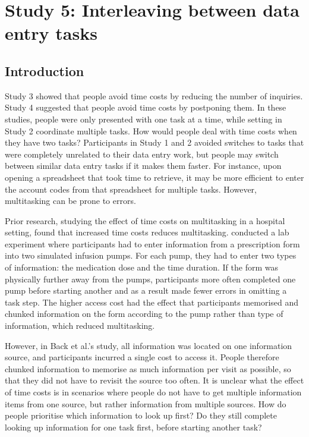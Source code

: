\section{Study 5: Interleaving between data entry tasks}
 
\subsection{Introduction}
Study 3 showed that people avoid time costs by reducing the number of inquiries. Study 4 suggested that people avoid time costs by postponing them. In these studies, people were only presented with one task at a time, while setting in Study 2 coordinate multiple tasks. How would people deal with time costs when they have two tasks? Participants in Study 1 and 2 avoided switches to tasks that were completely unrelated to their data entry work, but people may switch between similar data entry tasks if it makes them faster. For instance, upon opening a spreadsheet that took time to retrieve, it may be more efficient to enter the account codes from that spreadsheet for multiple tasks. However, multitasking can be prone to errors. 

Prior research, studying the effect of time costs on multitasking in a hospital setting, found that increased time costs reduces multitasking. \citet{Back2012} conducted a lab experiment where participants had to enter information from a prescription form into two simulated infusion pumps. For each pump, they had to enter two types of information: the medication dose and the time duration. If the form was physically further away from the pumps, participants more often completed one pump before starting another and as a result made fewer errors in omitting a task step. The higher access cost had the effect that participants memorised and chunked information on the form according to the pump rather than type of information, which reduced multitasking.

However, in Back et al.'s study, all information was located on one information source, and participants incurred a single cost to access it. People therefore chunked information to memorise as much information per visit as possible, so that they did not have to revisit the source too often. It is unclear what the effect of time costs is in scenarios where people do not have to get multiple information items from one source, but rather information from multiple sources. How do people prioritise which information to look up first? Do they still complete looking up information for one task first, before starting another task?

